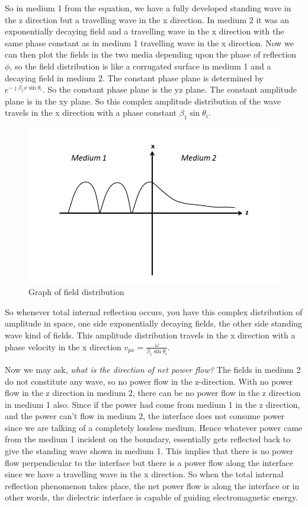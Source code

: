 So in medium 1 from the equation, we have a fully developed standing wave in the z direction but a travelling wave in the x direction. In medium 2 it was an exponentially decaying field and a travelling wave in the x direction with the same phase constant as in medium 1 travelling wave in the x direction. Now we can then plot the fields in the two media depending upon the phase of reflection $\phi$, so the field distribution is like a corrugated surface in medium 1 and a decaying field in medium 2. The constant phase plane is determined by $e^{- \jmath \beta_{1}x\sin\theta_i}$. So the constant phase plane is the yz plane. The constant amplitude plane is in the xy plane. So this complex amplitude distribution of the wave travels in the x direction with a phase constant $\beta_1\sin\theta_i$.
\begin{figure}[h]
\centering
\includegraphics[width=1\linewidth]{./graphics/field_distribution_total_internal_reflection}
\caption{Graph of field distribution}
\end{figure}

So whenever total internal reflection occurs, you have this complex distribution of amplitude in space, one side exponentially decaying fields, the other side standing wave kind of fields. This amplitude distribution travels in the x direction with a phase velocity in the x direction $v_{px} = \frac{\omega}{\beta_1\sin\theta_i}$.

Now we may ask, \emph{what is the direction of net power flow?} The fields in medium 2 do not constitute any wave, so no power flow in the z-direction. With no power flow in the z direction in medium 2, there can be no power flow in the z direction in medium 1 also. Since if the power had come from medium 1 in the z direction, and the power can't flow in medium 2, the interface does not consume power since we are talking of a completely lossless medium. Hence whatever power came from the medium 1 incident on the boundary, essentially gets reflected back to give the standing wave shown in medium 1. This implies that there is no power flow perpendicular to the interface but there is a power flow along the interface since we have a travelling wave in the x direction. So when the total internal reflection phenomenon takes place, the net power flow is along the interface or in other words, the dielectric interface is capable of guiding electromagnetic energy.

